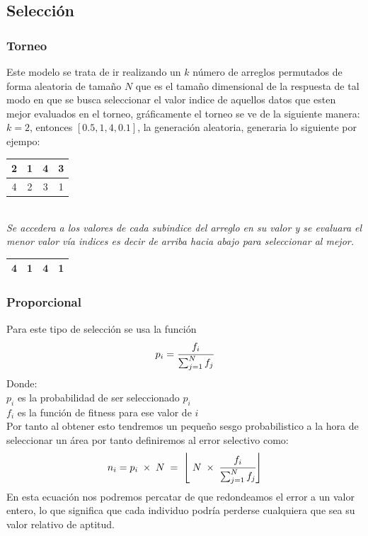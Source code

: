 \documentclass[10pt]{article}
\begin{document}
\subsection{Selección}
\subsubsection{Torneo}
Este modelo se trata de ir realizando un $k$ número de arreglos permutados de forma aleatoria de tamaño $N$ que es el tamaño dimensional de la respuesta de tal modo en que se busca seleccionar el valor indice de aquellos datos que esten mejor evaluados en el torneo, gráficamente el torneo se ve de la siguiente manera:\\
\(\displaystyle k=2\), entonces \(\displaystyle [0.5,1,4,0.1]\), la generación aleatoria, generaria lo siguiente por ejempo:\\
\begin{center}
  \begin{tabular}{|c|c|c|c|}
    \hline
    2&1&4&3\\
    \hline
    4&2&3&1\\
    \hline
  \end{tabular}\\
  \textit{Se accedera a los valores de cada subindice del arreglo en su valor y se evaluara el menor valor vía indices es decir de arriba hacia abajo para seleccionar al mejor.}\\
  \begin{tabular}{|c|c|c|c|}
    \hline
    4&1&4&1\\
    \hline
  \end{tabular}
\end{center}

\subsubsection{Proporcional}
Para este tipo de selección se usa la función
\[p_{i}=\cfrac{f_{i}}{\sum_{j=1}^{N}f_{j}}\]
Donde:\\
\(\displaystyle p_i\) es la probabilidad de ser seleccionado \(\displaystyle p_{i}\)\\\vspace{0.25cm}
\(\displaystyle f_{i}\) es la función de fitness para ese valor de \(\displaystyle i\)\\\vspace{0.25cm}
Por tanto al obtener esto tendremos un pequeño sesgo probabilistico a la hora de seleccionar un área por tanto definiremos al error selectivo como:
\[n_{i}=p_i\;\times\;N\;=\;\left\lfloor\;N\;\times\;\cfrac{f_{i}}{\sum_{j=1}^{N}f_{j}}\right\rfloor\]
En esta ecuación nos podremos percatar de que redondeamos el error a un valor entero, lo que significa que cada individuo podría perderse cualquiera que sea su valor relativo de aptitud.
\end{document}
